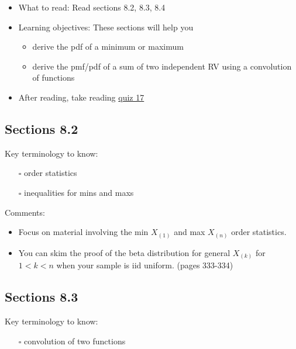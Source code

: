\documentclass[
  letterpaper,
]{scrbook}
\providecommand{\tightlist}{%
  \setlength{\itemsep}{0pt}\setlength{\parskip}{0pt}}\usepackage{longtable,booktabs,array}
\begin{document}
\begin{itemize}
\item
  What to read: Read sections 8.2, 8.3, 8.4
\item
  Learning objectives: These sections will help you

  \begin{itemize}
  \tightlist
  \item
    derive the pdf of a minimum or maximum
  \item
    derive the pmf/pdf of a sum of two independent RV using a
    convolution of functions
  \end{itemize}
\item
  After reading, take reading
  \href{https://forms.gle/KsqVyoKtsQLFrZcs5}{quiz 17}
\end{itemize}

\subsection*{Sections 8.2}\label{sections-8.2}

Key terminology to know:

\begin{itemize}
\tightlist
\item[$\square$]
  order statistics
\item[$\square$]
  inequalities for mins and maxs
\end{itemize}

Comments:

\begin{itemize}
\tightlist
\item
  Focus on material involving the min \(X_{(1)}\) and max \(X_{(n)}\)
  order statistics.
\item
  You can skim the proof of the beta distribution for general
  \(X_{(k)}\) for \(1 < k < n\) when your sample is iid uniform. (pages
  333-334)
\end{itemize}

\subsection*{Sections 8.3}\label{sections-8.3}

Key terminology to know:

\begin{itemize}
\tightlist
\item[$\square$]
  convolution of two functions
\end{itemize}
\end{document}

